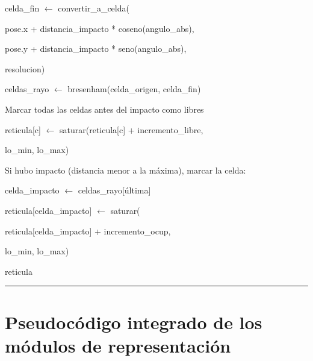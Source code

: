 \begin{algorithmic}[1]
    \State celda\_fin $\gets$
    convertir\_a\_celda(

    \Statex \hspace{1.3cm}
    pose.x + distancia\_impacto * coseno(angulo\_abs),

    \Statex \hspace{1.3cm}
    pose.y + distancia\_impacto * seno(angulo\_abs),

    \Statex \hspace{1.3cm}
    resolucion)

    \State celdas\_rayo $\gets$
    bresenham(celda\_origen, celda\_fin)

    \Statex

    \State Marcar todas las celdas antes del impacto como libres


        \State reticula[c] $\gets$
        saturar(reticula[c] + incremento\_libre,

        \Statex \hspace{2.2cm}
        lo\_min, lo\_max)

    \EndFor

    \Statex

    \State Si hubo impacto (distancia menor a la máxima), marcar la celda:


        \State celda\_impacto $\gets$
        celdas\_rayo[última]

        \State reticula[celda\_impacto] $\gets$
        saturar(

        \Statex \hspace{2.2cm}
        reticula[celda\_impacto] + incremento\_ocup,

        \Statex \hspace{2.2cm}
        lo\_min, lo\_max)

    \EndIf

\EndFor

\Statex
\State \Return reticula

\end{algorithmic}
\vspace{-0.9cm}
\rule{\textwidth}{0.4pt}

\section{Pseudocódigo integrado de los módulos de representación}
\label{apend:representa}


